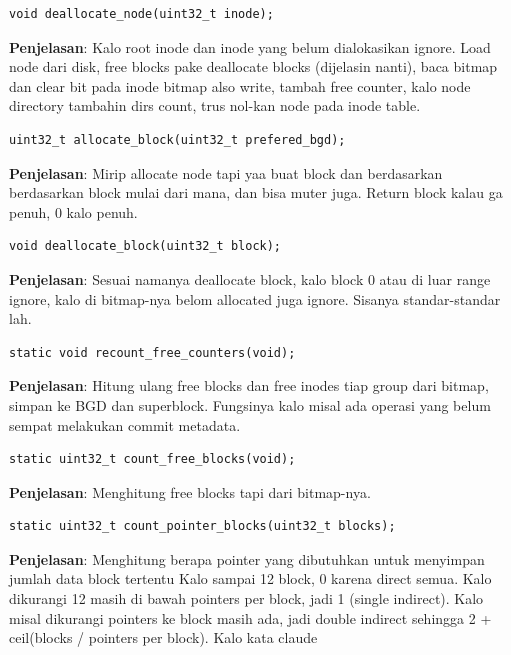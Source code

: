 \begin{lstlisting}
void deallocate_node(uint32_t inode);
\end{lstlisting}

\textbf{Penjelasan}: Kalo root inode dan inode yang belum dialokasikan ignore. Load node dari disk, free blocks pake deallocate blocks (dijelasin nanti), baca bitmap dan clear bit pada inode bitmap also write, tambah free counter, kalo node directory tambahin dirs count, trus nol-kan node pada inode table.

\begin{lstlisting}
uint32_t allocate_block(uint32_t prefered_bgd);
\end{lstlisting}

\textbf{Penjelasan}: Mirip allocate node tapi yaa buat block dan berdasarkan berdasarkan block mulai dari mana, dan bisa muter juga. Return block kalau ga penuh, 0 kalo penuh.

\begin{lstlisting}
void deallocate_block(uint32_t block);
\end{lstlisting}

\textbf{Penjelasan}: Sesuai namanya deallocate block, kalo block 0 atau di luar range ignore, kalo di bitmap-nya belom allocated juga ignore. Sisanya standar-standar lah.

\begin{lstlisting}
static void recount_free_counters(void);
\end{lstlisting}

\textbf{Penjelasan}: Hitung ulang free blocks dan free inodes tiap group dari bitmap, simpan ke BGD dan superblock. Fungsinya kalo misal ada operasi yang belum sempat melakukan commit metadata.

\begin{lstlisting}
static uint32_t count_free_blocks(void);
\end{lstlisting}

\textbf{Penjelasan}: Menghitung free blocks tapi dari bitmap-nya.

\begin{lstlisting}
static uint32_t count_pointer_blocks(uint32_t blocks);
\end{lstlisting}

\textbf{Penjelasan}: Menghitung berapa pointer yang dibutuhkan untuk menyimpan jumlah data block tertentu
Kalo sampai 12 block, 0 karena direct semua. Kalo dikurangi 12 masih di bawah pointers per block, jadi 1 (single indirect). Kalo misal dikurangi pointers ke block masih ada, jadi double indirect sehingga 2 + ceil(blocks / pointers per block). Kalo kata claude

